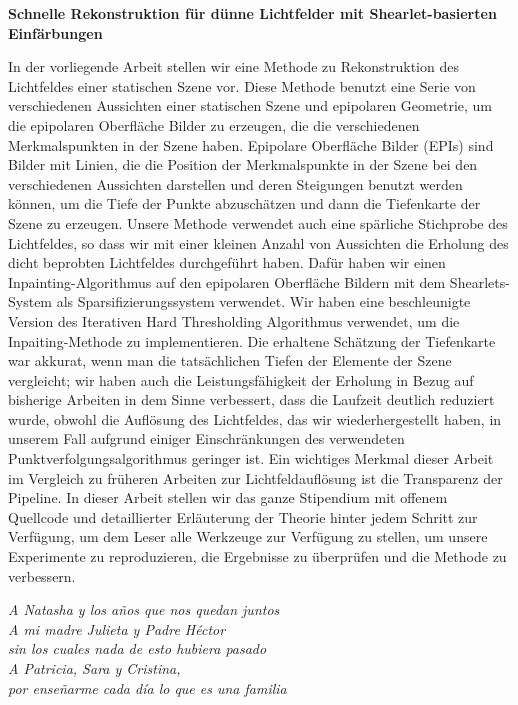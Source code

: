 \documentclass[11pt, english, singlespacing, headsepline, ]{MastersDoctoralThesis}
\theoremstyle{definition}
\begin{document}
\begin{center}
\textbf{Schnelle Rekonstruktion für dünne Lichtfelder mit Shearlet-basierten Einf\"arbungen}
\end{center}

In der vorliegende Arbeit stellen wir eine Methode zu Rekonstruktion des Lichtfeldes einer statischen Szene vor. Diese Methode benutzt eine Serie von verschiedenen Aussichten einer statischen Szene und epipolaren Geometrie, um die epipolaren Oberfläche Bilder zu erzeugen, die die verschiedenen Merkmalspunkten in der Szene haben. Epipolare Oberfläche Bilder (EPIs) sind Bilder mit Linien, die die Position der Merkmalspunkte in der Szene bei den verschiedenen Aussichten darstellen und deren Steigungen benutzt werden können, um die Tiefe der Punkte abzuschätzen und dann die Tiefenkarte der Szene zu erzeugen. Unsere Methode verwendet auch eine spärliche Stichprobe des Lichtfeldes, so dass wir mit einer kleinen Anzahl von Aussichten die Erholung des dicht beprobten Lichtfeldes durchgeführt haben. Dafür haben wir einen Inpainting-Algorithmus auf den epipolaren Oberfläche Bildern mit dem Shearlets-System als Sparsifizierungssystem verwendet. Wir haben eine beschleunigte Version des Iterativen Hard Thresholding Algorithmus verwendet, um die Inpaiting-Methode zu implementieren. Die erhaltene Schätzung der Tiefenkarte war akkurat, wenn man die tatsächlichen Tiefen der Elemente der Szene vergleicht; wir haben auch die Leistungsfähigkeit der Erholung in Bezug auf bisherige Arbeiten in dem Sinne verbessert, dass die Laufzeit deutlich reduziert wurde, obwohl die Auflösung des Lichtfeldes, das wir wiederhergestellt haben, in unserem Fall aufgrund einiger Einschränkungen des verwendeten Punktverfolgungsalgorithmus geringer ist. Ein wichtiges Merkmal dieser Arbeit im Vergleich zu früheren Arbeiten zur Lichtfeldauflösung ist die Transparenz der Pipeline. In dieser Arbeit stellen wir das ganze Stipendium mit offenem Quellcode und detaillierter Erläuterung der Theorie hinter jedem Schritt zur Verfügung, um dem Leser alle Werkzeuge zur Verfügung zu stellen, um unsere Experimente zu reproduzieren, die Ergebnisse zu überprüfen und die Methode zu verbessern.


\clearpage\pagestyle{empty}
\begin{flushleft}
\textit{A Natasha y los años que nos quedan juntos\\
A mi madre Julieta y Padre Héctor \\
sin los cuales nada de esto hubiera pasado\\
A Patricia, Sara y Cristina, \\
por enseñarme cada día lo que es una familia}
\end{flushleft}
\end{document}
